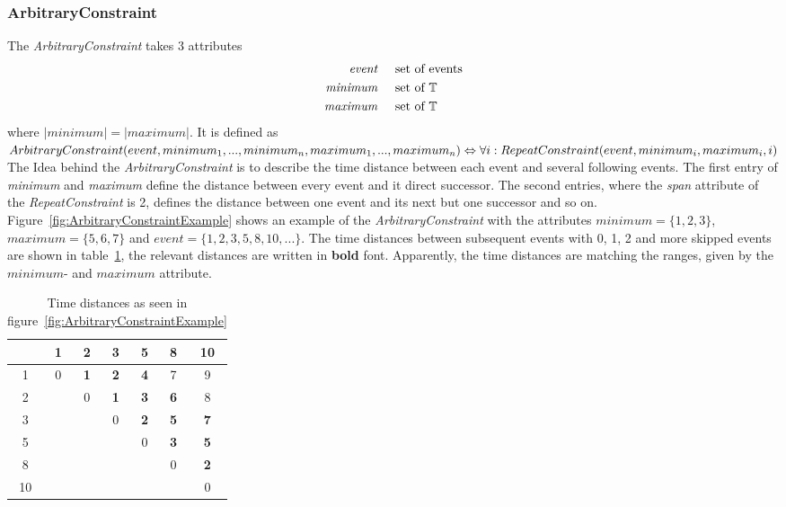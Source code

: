 	\subsubsection{ArbitraryConstraint}
		The \emph{ArbitraryConstraint} takes 3 attributes
		\begin{align*}
			\emph{event} 	& \hspace{.5cm}\text{set of events}\\
			\emph{minimum}	& \hspace{.5cm}\text{set of }\mathbb{T}\\
			\emph{maximum}	& \hspace{.5cm}\text{set of }\mathbb{T}
		\end{align*}
		where $|minimum|=|maximum|$. It is defined as \\[10pt]
		\begin{math}\\
			ArbitraryConstraint ( event, minimum_1, ..., minimum_n, maximum_1, ..., maximum_n)\\
			\Leftrightarrow\forall i: RepeatConstraint(event, minimum_i, maximum_i, i)
		\end{math}\\[10pt]
		The Idea behind the \emph{ArbitraryConstraint} is to describe the time distance between each event and several following events. The first entry of \emph{minimum} and \emph{maximum} define the distance between every event and it direct successor. The second entries, where the \emph{span} attribute of the  \emph{RepeatConstraint} is 2, defines the distance between one event and its next but one successor and so on.\\
		Figure~\ref{fig:ArbitraryConstraintExample} shows an example of the \emph{ArbitraryConstraint} with the attributes $minimum=\{1,2,3\}$, $maximum=\{5,6,7\}$ and $event=\{1, 2, 3, 5, 8, 10, ...\}$. The time distances between subsequent events with 0, 1, 2 and more skipped events are shown in table~\ref{tab:ArbitraryConstraintExampleTable}, the relevant distances are written in \textbf{bold} font. Apparently, the time distances are matching the ranges, given by the $minimum$- and $maximum$ attribute.\\
		\begin{table}
			\begin{tabular}{|c|c|c|c|c|c|c|}
				\hline
				& 1 & 2 & 3 & 5 & 8 & 10 \\
				\hline
				1 & 0 & \textbf{1} & \textbf{2} & \textbf{4} & 7 & 9 \\
				\hline
				2 &  & 0 & \textbf{1} & \textbf{3} & \textbf{6} & 8 \\
				\hline
				3 &  &  & 0 & \textbf{2} & \textbf{5} & \textbf{7} \\
				\hline
				5 &  &  &  & 0 & \textbf{3} & \textbf{5} \\
				\hline
				8 &  &  &  &  & 0 & \textbf{2} \\
				\hline
				10 &  &  &  &  &  & 0 \\
				\hline
			\end{tabular}
			\centering
			\caption{Time distances as seen in figure~\ref{fig:ArbitraryConstraintExample}}
			\label{tab:ArbitraryConstraintExampleTable}
		\end{table}

